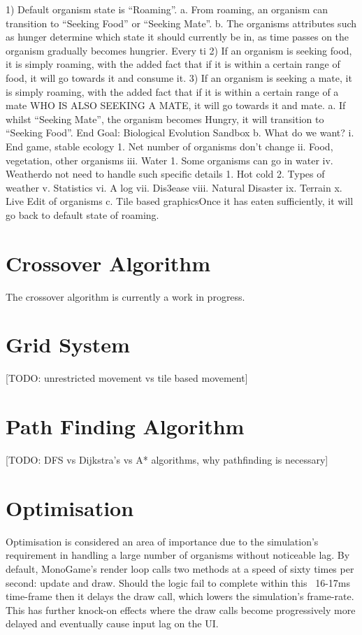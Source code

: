 \documentclass[a4paper, oneside, 11pt]{report}
\begin{document}
1) Default organism state is “Roaming”.
a. From roaming, an organism can transition to “Seeking Food” or “Seeking Mate”.
b. The organisms attributes such as hunger determine which state it should currently be in, as time passes on the organism gradually becomes hungrier. Every ti
2) If an organism is seeking food, it is simply roaming, with the added fact that if it is within a certain range of food, it will go towards it and consume it.
3) If an organism is seeking a mate, it is simply roaming, with the added fact that if it is within a certain range of a mate WHO IS ALSO SEEKING A MATE, it will go towards it and mate.
a. If whilst “Seeking Mate”, the organism becomes Hungry, it will transition to “Seeking Food”. End Goal: Biological Evolution Sandbox
b. What do we want?
i. End game, stable ecology
1. Net number of organisms don’t change
ii. Food, vegetation, other organisms
iii. Water
1. Some organisms can go in water
iv. Weatherdo not need to handle such specific details
1. Hot cold
2. Types of weather
v. Statistics
vi. A log
vii. Dis3ease
viii. Natural Disaster
ix. Terrain
x. Live Edit of organisms
c. Tile based graphicsOnce it has eaten sufficiently, it will go back to default state of roaming.

\section{Crossover Algorithm}\label{crossover}
The crossover algorithm is currently a work in progress.

\section{Grid System}\label{grid}
[TODO: unrestricted movement vs tile based movement]

\section{Path Finding Algorithm}\label{pathfinding}
[TODO: DFS vs Dijkstra's vs A* algorithms, why pathfinding is necessary]

\section{Optimisation}\label{optim}
Optimisation is considered an area of importance due to the simulation's requirement in handling a large number of organisms without noticeable lag. By default, MonoGame's render loop calls two methods at a speed of sixty times per second: update and draw. Should the logic fail to complete within this ~16-17ms time-frame then it delays the draw call, which lowers the simulation's frame-rate. This has further knock-on effects where the draw calls become progressively more delayed and eventually cause input lag on the UI.
\end{document}
